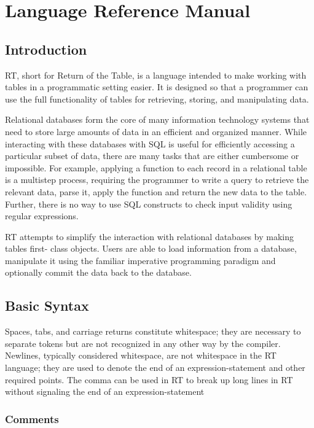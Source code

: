 \chapter{Language Reference Manual}                  

\section{Introduction}
RT, short for Return of the Table, is a language intended to make working with tables in a programmatic 
setting easier.  It is designed so that a programmer can use the full functionality of 
tables for retrieving, storing, and manipulating data.

Relational databases form the core of many information technology systems that 
need to store large amounts of data in an efficient and organized manner. While 
interacting with these databases with SQL is useful for efficiently accessing a 
particular subset of data, there are many tasks that are either cumbersome or impossible. 
For example, applying a function to each record in a relational table is a multistep process, 
requiring the programmer to write a query to retrieve the relevant data, parse it, apply the 
function and return the new data to the table. Further, there is no way to use SQL constructs 
to check input validity using regular expressions.

RT attempts to simplify the interaction with relational databases by making tables first-
class objects. Users are able to load information from a database, manipulate it using the 
familiar imperative programming paradigm and optionally commit the data back to the database.

\section{Basic Syntax}

Spaces, tabs, and carriage returns constitute whitespace; they are 
necessary to separate tokens but are not recognized in any other way by the compiler.  Newlines, typically
considered whitespace, are not whitespace in the RT language; they are used to denote the end of an 
expression-statement and other required points. The comma can be used in RT to break up long lines in 
RT without signaling the end of an expression-statement

\subsection{Comments}

